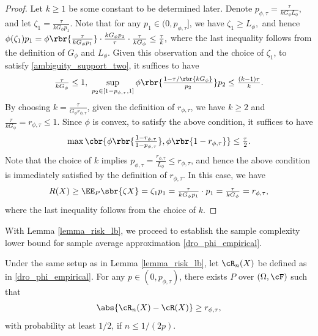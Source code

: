 \documentclass[9pt]{article} %
\numberwithin{equation}{section}
\renewcommand{\frac}[2]{\tfrac{#1}{#2}}
\begin{document}
\begin{proof}
Let $k \geq 1$ be some constant to be determined later. 
Denote $p_{\phi, \tau} =  \frac{\tau}{k G_\phi L_\phi}$, and let $\zeta_1 = \frac{\tau}{k G_\phi p_1}$. 
Note that for any  $p_1 \in (0,  p_{\phi, \tau}]$, we have 
$
\zeta_1 \geq L_\phi, 
$
and hence
$
\phi(\zeta_1) p_1 = \phi \rbr{ \frac{\tau}{k G_\phi p_1} }  \cdot \frac{k G_\phi p_1}{\tau} \cdot \frac{\tau}{k G_\phi} \leq \frac{\tau}{k},
$
where the last inequality follows from the definition of $G_\phi$ and $L_\phi$.
Given this observation and the choice of $\zeta_1$, to satisfy \eqref{ambiguity_support_two}, it suffices to have 
\begin{align*}
\frac{\tau}{k G_\phi} \leq 1,  ~ \sup_{p_2 \in [1- p_{\phi, \tau}, 1]} \phi \rbr{ \frac{1 - {\tau}/\rbr{k G_\phi}}{p_2} }  p_2 \leq \frac{(k-1) \tau}{k}.
\end{align*}
By choosing $k = \frac{\tau}{G_\phi r_{\phi, \tau}}$, given the definition of $r_{\phi, \tau}$, we have $k \geq 2$ and $\frac{\tau}{k G_\phi} = r_{\phi, \tau} \leq 1$. 
 Since $\phi$ is convex, to satisfy the above condition, it suffices to have 
\begin{align*}
\max \cbr{
\phi \rbr{ \frac{1 - r_{\phi, \tau}}{ 1 - p_{\phi, \tau}}}, \phi \rbr{ 1- r_{\phi, \tau} } 
}
\leq \frac{\tau}{2}.
\end{align*}
Note that the choice of $k$ implies $p_{\phi ,\tau} = \frac{r_{\phi, \tau}}{ L_\phi} \leq r_{\phi, \tau}$, and hence the above condition is immediately satisfied by the definition of $r_{\phi, \tau}$.
In this case, we have 
\begin{align*}
R(X) \geq \EE_P \sbr{\zeta X} = \zeta_1 p_1 = \frac{\tau}{k G_\phi p_1} \cdot p_1 = \frac{\tau}{k G_\phi} = r_{\phi, \tau},
\end{align*}
where the last inequality follows from the choice of $k$.
\end{proof}


With Lemma \ref{lemma_risk_lb}, we proceed to establish the sample complexity lower bound for sample average approximation \eqref{dro_phi_empirical}. 

\begin{theorem}
Under the same setup as in Lemma \ref{lemma_risk_lb}, let $\cR_n(X)$ be defined as in \eqref{dro_phi_empirical}.
For any $p \in (0,  p_{\phi, \tau})$,  there exists $P$ over $(\Omega, \cF)$ such that 
\begin{align*}
\abs{{\cR}_n (X) - \cR(X) } \geq {r_{\phi, \tau}} ,
\end{align*}
with probability at least $1/2$, 
if $n \leq 1/(2 p)$.
\end{theorem}
\end{document}
